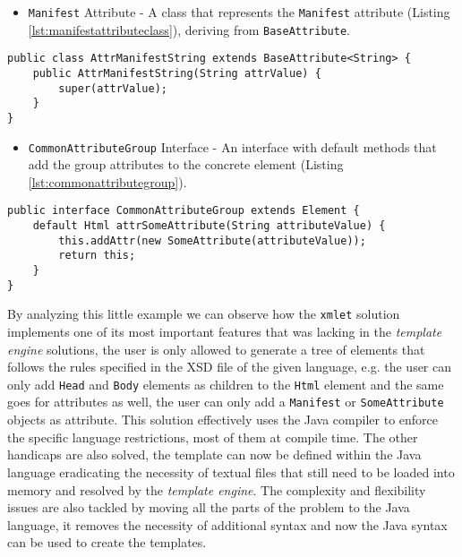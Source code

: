 \begin{itemize}
	\item \texttt{Manifest} Attribute - A class that represents the \texttt{Manifest} attribute  (Listing \ref{lst:manifestattributeclass}), deriving from \texttt{BaseAttribute}.
\end{itemize}

\bigskip


\begin{minipage}{\linewidth}
\begin{lstlisting}[caption={Generated Manifest Attribute Class},captionpos=b,label={lst:manifestattributeclass}]
public class AttrManifestString extends BaseAttribute<String> {
    public AttrManifestString(String attrValue) {
        super(attrValue);
    }
}
\end{lstlisting}
\end{minipage}

\begin{itemize}
	\item \texttt{CommonAttributeGroup} Interface - An interface with default methods that add the group attributes to the concrete element (Listing \ref{lst:commonattributegroup}).
\end{itemize}

\bigskip


\begin{minipage}{\linewidth}
\begin{lstlisting}[caption={Generated CommonAttributeGroup Interface},captionpos=b,label={lst:commonattributegroup}]
public interface CommonAttributeGroup extends Element {
    default Html attrSomeAttribute(String attributeValue) {
        this.addAttr(new SomeAttribute(attributeValue));
        return this;
    }
}
\end{lstlisting}
\end{minipage}

\noindent
By analyzing this little example we can observe how the \texttt{xmlet} solution implements one of its most important features that was lacking in the \textit{template engine} solutions, the user is only allowed to generate a tree of elements that follows the rules specified in the \ac{XSD} file of the given language, e.g. the user can only add \texttt{Head} and \texttt{Body} elements as children to the \texttt{Html} element and the same goes for attributes as well, the user can only add a \texttt{Manifest} or \texttt{SomeAttribute} objects as attribute. This solution effectively uses the Java compiler to enforce the specific language restrictions, most of them at compile time. The other handicaps are also solved, the template can now be defined within the Java language eradicating the necessity of textual files that still need to be loaded into memory and resolved by the \textit{template engine}. The complexity and flexibility issues are also tackled by moving all the parts of the problem to the Java language, it removes the necessity of additional syntax and now the Java syntax can be used to create the templates.

